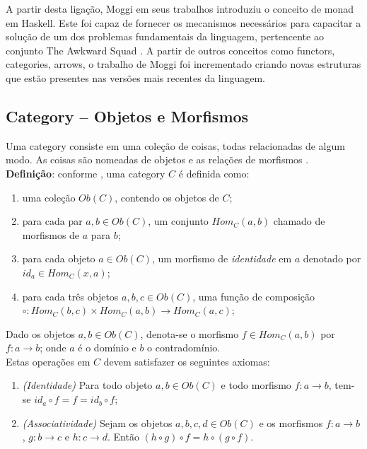 \documentclass[10pt, conference]{IEEEtran}
\begin{document}
A partir desta ligação, Moggi em seus trabalhos \cite{moggi1989lambdaandmonads, mogi1991notionsofcompandmonad} introduziu o conceito de monad em Haskell. Este foi capaz de fornecer os mecanismos necessários para capacitar a solução de um dos problemas fundamentais da linguagem,  pertencente ao conjunto The Awkward Squad \cite{jones2001tacklingthe}. A partir de outros conceitos como functors, categories, arrows, o trabalho de Moggi foi incrementado criando novas estruturas que estão presentes nas versões mais recentes da linguagem.

\subsection{Category -- Objetos e Morfismos}

Uma category consiste em uma coleção de coisas, todas relacionadas de algum modo. As coisas são nomeadas de objetos e as relações de morfismos \cite{spivak2014cts}.\\

\textbf{Definição}: conforme \cite{spivak2014cts, maclane1971mat}, uma category $C$ é definida como:

\begin{enumerate}[label=(\alph*), leftmargin=3em, topsep = 0pt, itemsep = 1ex, partopsep = 1ex, parsep = 1ex]
	\item uma coleção $Ob(C)$, contendo os objetos de $C$;
	\item para cada par $a, b \in Ob(C)$, um conjunto $Hom_C(a, b)$ chamado de morfismos de $a$ para $b$;
	\item para cada objeto $a \in Ob(C)$, um morfismo de \textit{identidade} em $a$ denotado por $id_a \in Hom_C(x, a)$;
	\item para cada três objetos $a, b, c \in Ob(C)$, uma função de composição $\circ: Hom_C(b, c) \times Hom_C(a, b) \rightarrow Hom_C(a, c)$;
\end{enumerate}

Dado os objetos $a, b \in Ob(C)$, denota-se o morfismo $f \in Hom_C(a, b)$ por $f: a \rightarrow b$; onde $a$ é o domínio e $b$ o contradomínio.\\

Estas operações em $C$ devem satisfazer os seguintes axiomas:

\begin{enumerate}[label={}, leftmargin = 2em, topsep = 0pt, itemsep = 1ex,partopsep = 1ex, parsep = 1ex]
	\item \textit{(Identidade)} Para todo objeto $a, b \in Ob(C)$ e todo morfismo $f: a \rightarrow b$, tem-se $id_a \circ f = f = id_b \circ f$;
	\item \textit{(Associatividade)} Sejam os objetos $a, b, c, d \in Ob(C)$ e os morfismos $f: a \rightarrow b$, $g: b \rightarrow c$ e $h: c \rightarrow d$. Então $(h \circ g) \circ f = h \circ (g \circ f)$.
\end{enumerate}
\end{document}
